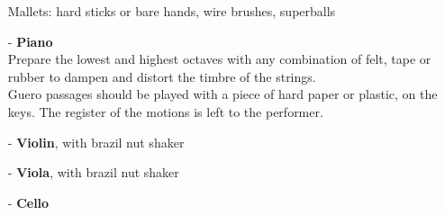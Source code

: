 \documentclass[10pt]{article}
\begin{document}
\begin{textblock}{23}
\begin{itemize}
        Mallets: hard sticks or bare hands, wire brushes, superballs \\

    \item[-] \textbf{Piano} \\

        Prepare the lowest and highest octaves with any combination of
        felt, tape or rubber to dampen and distort the timbre of the
        strings. \\

        Guero passages should be played with a piece of hard paper or
        plastic, on the keys. The register of the motions is left to the
        performer. \\

    \item[-] \textbf{Violin}, with brazil nut shaker \\

    \item[-] \textbf{Viola}, with brazil nut shaker \\

    \item[-] \textbf{Cello}

\end{itemize}

\end{textblock}
\end{document}
